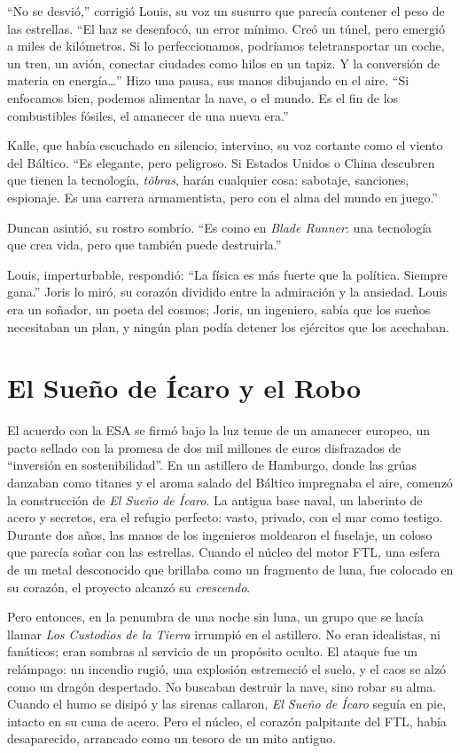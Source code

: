 “No se desvió,” corrigió Louis, su voz un susurro que parecía contener el peso de las estrellas. “El haz se desenfocó, un error mínimo. Creó un túnel, pero emergió a miles de kilómetros. Si lo perfeccionamos, podríamos teletransportar un coche, un tren, un avión, conectar ciudades como hilos en un tapiz. Y la conversión de materia en energía\dots” Hizo una pausa, sus manos dibujando en el aire. “Si enfocamos bien, podemos alimentar la nave, o el mundo. Es el fin de los combustibles fósiles, el amanecer de una nueva era.”

Kalle, que había escuchado en silencio, intervino, su voz cortante como el viento del Báltico. “Es elegante, pero peligroso. Si Estados Unidos o China descubren que tienen la tecnología, \emph{tõbras}, harán cualquier cosa: sabotaje, sanciones, espionaje. Es una carrera armamentista, pero con el alma del mundo en juego.”

Duncan asintió, su rostro sombrío. “Es como en \emph{Blade Runner}: una tecnología que crea vida, pero que también puede destruirla.”

Louis, imperturbable, respondió: “La física es más fuerte que la política. Siempre gana.” Joris lo miró, su corazón dividido entre la admiración y la ansiedad. Louis era un soñador, un poeta del cosmos; Joris, un ingeniero, sabía que los sueños necesitaban un plan, y ningún plan podía detener los ejércitos que los acechaban.

\section{El Sueño de Ícaro y el Robo}
\label{sec:sueno-icaro-robo}

El acuerdo con la ESA se firmó bajo la luz tenue de un amanecer europeo, un pacto sellado con la promesa de dos mil millones de euros disfrazados de “inversión en sostenibilidad”. En un astillero de Hamburgo, donde las grúas danzaban como titanes y el aroma salado del Báltico impregnaba el aire, comenzó la construcción de \emph{El Sueño de Ícaro}. La antigua base naval, un laberinto de acero y secretos, era el refugio perfecto: vasto, privado, con el mar como testigo. Durante dos años, las manos de los ingenieros moldearon el fuselaje, un coloso que parecía soñar con las estrellas. Cuando el núcleo del motor FTL, una esfera de un metal desconocido que brillaba como un fragmento de luna, fue colocado en su corazón, el proyecto alcanzó su \emph{crescendo}.

Pero entonces, en la penumbra de una noche sin luna, un grupo que se hacía llamar \emph{Los Custodios de la Tierra} irrumpió en el astillero. No eran idealistas, ni fanáticos; eran sombras al servicio de un propósito oculto. El ataque fue un relámpago: un incendio rugió, una explosión estremeció el suelo, y el caos se alzó como un dragón despertado. No buscaban destruir la nave, sino robar su alma. Cuando el humo se disipó y las sirenas callaron, \emph{El Sueño de Ícaro} seguía en pie, intacto en su cuna de acero. Pero el núcleo, el corazón palpitante del FTL, había desaparecido, arrancado como un tesoro de un mito antiguo.

